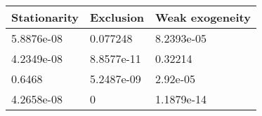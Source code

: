 \begin{tabular}{lll}
Stationarity & Exclusion & Weak exogeneity \\ 
\hline 
5.8876e-08 & 0.077248 & 8.2393e-05 \\ 
4.2349e-08 & 8.8577e-11 & 0.32214 \\ 
0.6468 & 5.2487e-09 & 2.92e-05 \\ 
4.2658e-08 & 0 & 1.1879e-14 \\ 
\hline 
\end{tabular}